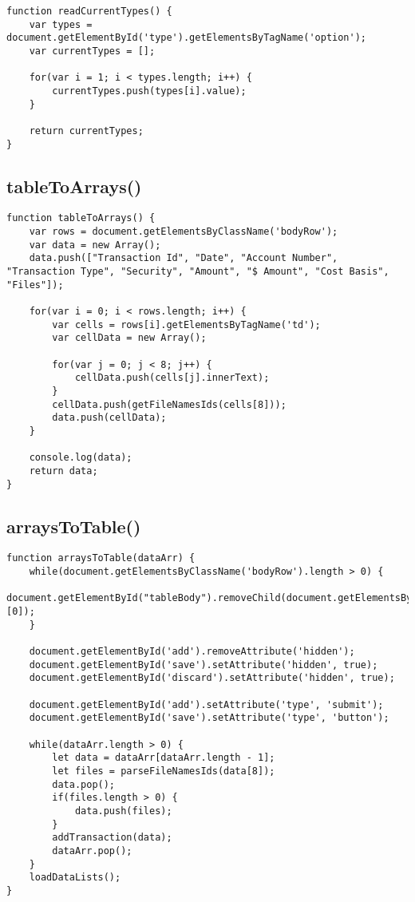 \documentclass[letterpaper]{article}
\begin{document}
\begin{lstlisting}[firstnumber=734]
function readCurrentTypes() {
    var types = document.getElementById('type').getElementsByTagName('option');
    var currentTypes = [];

    for(var i = 1; i < types.length; i++) {
        currentTypes.push(types[i].value);
    }

    return currentTypes;
}
\end{lstlisting}

\subsection{tableToArrays()}

\begin{lstlisting}[firstnumber=745]
function tableToArrays() {
    var rows = document.getElementsByClassName('bodyRow');
    var data = new Array();
    data.push(["Transaction Id", "Date", "Account Number", "Transaction Type", "Security", "Amount", "$ Amount", "Cost Basis", "Files"]);

    for(var i = 0; i < rows.length; i++) {
        var cells = rows[i].getElementsByTagName('td');
        var cellData = new Array();

        for(var j = 0; j < 8; j++) {
            cellData.push(cells[j].innerText);
        }
        cellData.push(getFileNamesIds(cells[8]));
        data.push(cellData);
    }

    console.log(data);
    return data;
}
\end{lstlisting}

\subsection{arraysToTable()}

\begin{lstlisting}[firstnumber=765]
function arraysToTable(dataArr) {
    while(document.getElementsByClassName('bodyRow').length > 0) {
        document.getElementById("tableBody").removeChild(document.getElementsByClassName('bodyRow')[0]);
    }

    document.getElementById('add').removeAttribute('hidden');
    document.getElementById('save').setAttribute('hidden', true);
    document.getElementById('discard').setAttribute('hidden', true);

    document.getElementById('add').setAttribute('type', 'submit');
    document.getElementById('save').setAttribute('type', 'button');

    while(dataArr.length > 0) {
        let data = dataArr[dataArr.length - 1];
        let files = parseFileNamesIds(data[8]);
        data.pop();
        if(files.length > 0) {
            data.push(files);
        }
        addTransaction(data);
        dataArr.pop();
    }
    loadDataLists();
}
\end{lstlisting}
\end{document}

